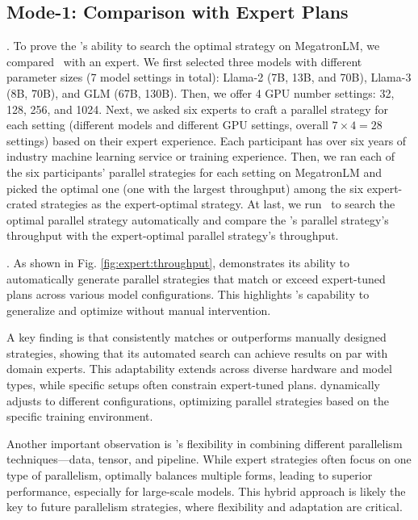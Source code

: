 \subsection{Mode-1: Comparison with Expert Plans}\label{sec:exp:expert}

.
To prove the \sysname's ability to search the optimal strategy on MegatronLM, we compared \sysname\ with an expert.
We first selected three models with different parameter sizes (7 model settings in total): Llama-2 (7B, 13B, and 70B), Llama-3 (8B, 70B), and GLM (67B, 130B).
Then, we offer 4 GPU number settings: 32, 128, 256, and 1024.
Next, we asked six experts to craft a parallel strategy for each setting (different models and different GPU settings, overall $7\times 4=28$ settings) based on their expert experience.
Each participant has over six years of industry machine learning service or training experience.
Then, we ran each of the six participants' parallel strategies for each setting on MegatronLM and picked the optimal one (one with the largest throughput) among the six expert-crated strategies as the expert-optimal strategy.
At last, we run \sysname\ to search the optimal parallel strategy automatically and compare the \sysname's parallel strategy's throughput with the expert-optimal parallel strategy's throughput.

.
As shown in Fig. \ref{fig:expert:throughput}, \sysname demonstrates its ability to automatically generate parallel strategies that match or exceed expert-tuned plans across various model configurations. This highlights \sysname's capability to generalize and optimize without manual intervention.

\par A key finding is that \sysname consistently matches or outperforms manually designed strategies, showing that its automated search can achieve results on par with domain experts. This adaptability extends across diverse hardware and model types, while specific setups often constrain expert-tuned plans. \sysname dynamically adjusts to different configurations, optimizing parallel strategies based on the specific training environment.

\par Another important observation is \sysname’s flexibility in combining different parallelism techniques—data, tensor, and pipeline. While expert strategies often focus on one type of parallelism, \sysname optimally balances multiple forms, leading to superior performance, especially for large-scale models. This hybrid approach is likely the key to future parallelism strategies, where flexibility and adaptation are critical.